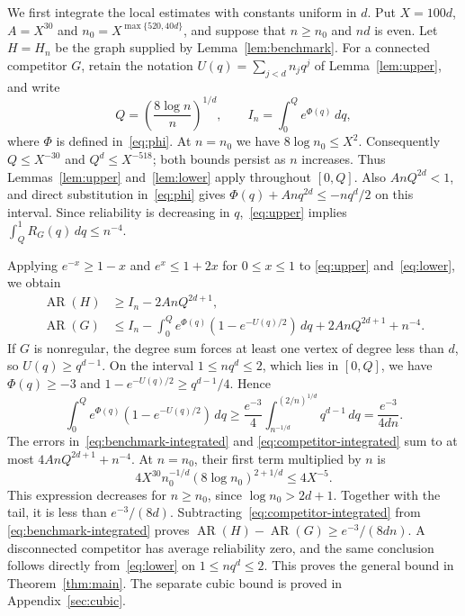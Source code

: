 \documentclass[11pt,reqno]{amsart}
\theoremstyle{remark}
\numberwithin{equation}{section}
\newcommand{\AR}{\operatorname{AR}}
\begin{document}
We first integrate the local estimates with constants uniform in $d$.
Put $X=100d$, $A=X^{30}$ and
$n_0=X^{\max\{520,40d\}}$, and suppose that $n\ge n_0$ and $nd$ is even.
Let $H=H_n$ be the graph supplied by Lemma~\ref{lem:benchmark}.
For a connected competitor $G$, retain the notation
$U(q)=\sum_{j<d}n_jq^j$ of Lemma~\ref{lem:upper}, and write
\begin{equation}\label{eq:cutoff-integral}
 Q=\left(\frac{8\log n}{n}\right)^{1/d},
 \qquad I_n=\int_0^Q e^{\Phi(q)}\,dq,
\end{equation}
where $\Phi$ is defined in~\eqref{eq:phi}.
At $n=n_0$ we have $8\log n_0\le X^2$. Consequently
$Q\le X^{-30}$ and $Q^d\le X^{-518}$; both bounds persist as $n$ increases.
Thus Lemmas~\ref{lem:upper} and~\ref{lem:lower} apply throughout $[0,Q]$.
Also $AnQ^{2d}<1$, and direct substitution in~\eqref{eq:phi} gives
$\Phi(q)+Anq^{2d}\le-nq^d/2$ on this interval.
Since reliability is decreasing in $q$,~\eqref{eq:upper} implies
$\int_Q^1R_G(q)\,dq\le n^{-4}$.

Applying $e^{-x}\ge1-x$ and $e^x\le1+2x$ for $0\le x\le1$ to
\eqref{eq:upper} and~\eqref{eq:lower}, we obtain
\begin{align}
 \AR(H)&\ge I_n-2AnQ^{2d+1},\label{eq:benchmark-integrated}\\
 \AR(G)&\le I_n-\int_0^Q e^{\Phi(q)}
                 (1-e^{-U(q)/2})\,dq
                 +2AnQ^{2d+1}+n^{-4}.\label{eq:competitor-integrated}
\end{align}
If $G$ is nonregular, the degree sum forces at least one vertex of degree
less than $d$, so $U(q)\ge q^{d-1}$. On the interval $1\le nq^d\le2$,
which lies in $[0,Q]$, we have $\Phi(q)\ge-3$ and
$1-e^{-U(q)/2}\ge q^{d-1}/4$. Hence
\begin{equation}\label{eq:defect-window}
 \int_0^Qe^{\Phi(q)}(1-e^{-U(q)/2})\,dq
 \ge \frac{e^{-3}}4
       \int_{n^{-1/d}}^{(2/n)^{1/d}}q^{d-1}\,dq
 =\frac{e^{-3}}{4dn}.
\end{equation}
The errors in~\eqref{eq:benchmark-integrated} and
\eqref{eq:competitor-integrated} sum to at most
$4AnQ^{2d+1}+n^{-4}$. At $n=n_0$, their first term multiplied by $n$ is
\[
 4X^{30}n_0^{-1/d}(8\log n_0)^{2+1/d}\le4X^{-5}.
\]
This expression decreases for $n\ge n_0$, since $\log n_0>2d+1$.
Together with the tail, it is less than $e^{-3}/(8d)$.
Subtracting~\eqref{eq:competitor-integrated} from
\eqref{eq:benchmark-integrated} proves
$\AR(H)-\AR(G)\ge e^{-3}/(8dn)$.
A disconnected competitor has average reliability zero, and the same
conclusion follows directly from~\eqref{eq:lower} on $1\le nq^d\le2$.
This proves the general bound in Theorem~\ref{thm:main}. The separate cubic bound is proved in Appendix~\ref{sec:cubic}.
\end{document}
